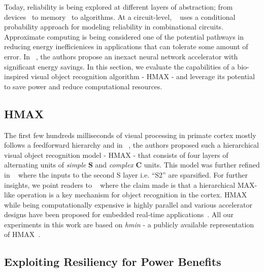 Today, reliability is being explored at different layers of abstraction; from devices~\cite{Datta2014,Datta2015,Rahul2015} to memory~\cite{isca2014} to algorithms.
At a circuit-level, ~\cite{chen2015fast} uses a conditional probability approach for modeling reliability in combinational circuits.
Approximate computing is being considered one of the potential pathways in reducing energy inefficienices in applications that can tolerate some amount of error.
In ~\cite{temam2015}, the authors propose an inexact neural network accelerator with significant energy savings.
In this section, we evaluate the capabilities of a bio-inspired visual object recognition algorithm - HMAX - and leverage its potential to save 
power and reduce computational resources. 

\subsection{HMAX}
The first few hundreds milliseconds of visual processing in primate
cortex mostly follows a feedforward hierarchy and in ~\cite{serre}, the authors proposed such a hierarchical visual object recognition model - HMAX - that consists of 
four layers of alternating units of \textit{simple} \textbf{S} and \textit{complex} \textbf{C} units. 
This model was further refined in ~\cite{Mutch2008} where the inputs to 
the second S layer i.e. ``S2'' are sparsified. For further insights, we point readers to ~\cite{poggio} where the claim made is 
that a hierarchical MAX-like operation is a key mechanism for object recognition in the cortex.
HMAX while being computationally expensive is highly parallel and various accelerator designs have been proposed for 
embedded real-time applications~\cite{Kestur2012, Maashri2012a}. 
All our experiments in this work are based on \textit{hmin} - a publicly available representation of HMAX~\cite{hmin}.

\subsection{Exploiting Resiliency for Power Benefits}

